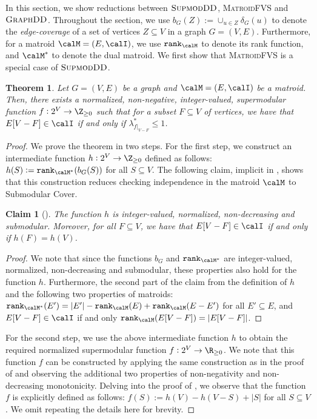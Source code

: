 \documentclass{article}
\newtheorem{theorem}{Theorem}[section]
\newtheorem{claim}{Claim}[section]
\newcommand{\matroidrank}{\ensuremath{\texttt{rank}}\xspace}
\newcommand{\mfvs}{\textsc{MatroidFVS}\xspace}
\newcommand{\dds}{\ensuremath{\textsc{GraphDD}}\xspace}
\newcommand{\sdds}{\ensuremath{\textsc{SupmodDD}}\xspace}
\begin{document}
In this section, we show reductions between \sdds, \mfvs and \dds. Throughout the section, we use $b_{G}(Z) := \cup_{u \in Z}\delta_G(u)$ to denote the \emph{edge-coverage} of  a set of vertices $Z \subseteq V$ in a graph $G = (V, E)$. Furthermore, for a matroid $\calM = (E, \calI)$, we use $\matroidrank_{\calM}$ to denote its rank function, and $\calM^*$ to denote the dual matroid. We first show that \mfvs is a special case of \sdds.
\begin{theorem}\label{thm:matroidfvs-to-supmodDD}
    Let $G = (V, E)$ be a graph and $\calM = (E, \calI)$ be a matroid. Then, there exists a normalized, non-negative, integer-valued, supermodular function $f:2^V\rightarrow\Z_{\geq 0}$ such that for a subset $F\subseteq V$ of vertices, we have that $E[V - F] \in \calI$ if and only if $\lambda^*_{f|_{V - F}}\leq 1$.
\end{theorem}
\begin{proof}
We prove the theorem in two steps. For the first step, we construct an intermediate function $h:2^V\rightarrow\Z_{\geq 0}$ defined as follows: $h(S) := \matroidrank_{\calM^*}(b_G(S))$ for all $S \subseteq V$. The following claim, implicit in \cite{Fujito-matroid-fvs}, shows that this construction reduces checking independence in the matroid $\calM$ to Submodular Cover.
\begin{claim}[\cite{Fujito-matroid-fvs}]
    The function $h$ is integer-valued, normalized, non-decreasing and submodular. Moreover, for all $F \subseteq V$, we have that $E[V - F] \in \calI$ if and only if $h(F) = h(V)$.
\end{claim}
\begin{proof}
    We note that since the functions $b_G$ and $\matroidrank_{\calM^*}$ are integer-valued, normalized, non-decreasing and submodular, these properties also hold for the function $h$. Furthermore, the second part of the claim from the definition of $h$ and the following two properties of matroids: $\matroidrank_{\calM^*}(E') = |E'| - \matroidrank_{\calM}(E) + \matroidrank_{\calM}(E-E')$ for all $E' \subseteq E$, and $E[V - F] \in \calI$ if and only $\matroidrank_{\calM}(E[V - F]) = |E[V - F]|$.
\end{proof}

For the second step, we use the above intermediate function $h$ to obtain the required normalized supermodular function $f:2^V\rightarrow\R_{\geq 0}$. We note that this function $f$ can be constructed by applying the same construction as in the proof of  and observing the additional two properties of non-negativity and non-decreasing monotonicity. Delving into the proof of , we observe that the function $f$ is explicitly defined as follows: $f(S) := h(V) - h(V - S) + |S|$ for all $S \subseteq V$. We omit repeating the details here for brevity.
\end{proof}
\end{document}
